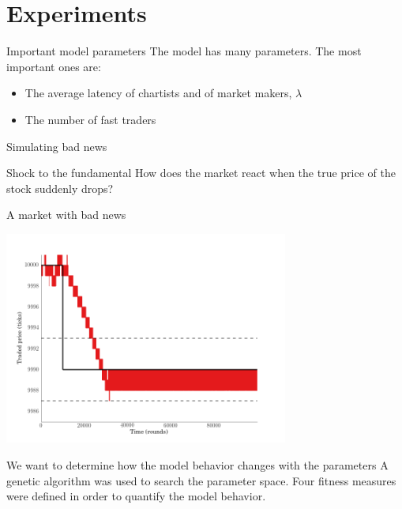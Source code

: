 \documentclass[14pt]{beamer}
\begin{document}
\section{Experiments}
\begin{frame}
\tableofcontents[currentsection]
\end{frame}

\begin{frame}{Important model parameters}
The model has many parameters. The most important ones are:
\begin{itemize}
\item The average latency of chartists and of market makers, $\lambda$
\item The number of fast traders
\end{itemize}
\end{frame}


\begin{frame}{Simulating bad news}
\begin{block}{Shock to the fundamental}
How does the market react when the true price of the stock suddenly drops?
\end{block}
\end{frame}

\begin{frame}{A market with bad news}
\begin{center}
\includegraphics[width=0.7\textwidth]{market_cases/a_stable_within_margin.png}
\end{center}
\end{frame}

\begin{frame}{}
\begin{block}{We want to determine how the model behavior changes with the parameters}
A genetic algorithm was used to search the parameter space. Four fitness measures were defined in order to quantify the model behavior.
\end{block}
\end{frame}
\end{document}
